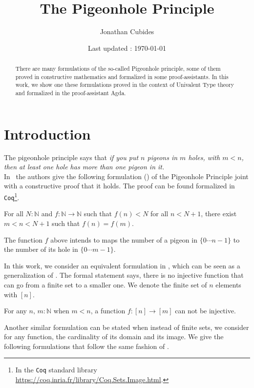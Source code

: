 \documentclass[11pt, a4paper, oneside]{amsart}
\title{The Pigeonhole Principle}
\date{Last updated : \today}
\author{Jonathan Cubides}
\begin{document}
\maketitle

\begin{abstract}
There are many formulations of the so-called Pigeonhole principle,
some of them proved in constructive mathematics and formalized
in some proof-assistants. In this work, we show one these formulations
proved in the context of Univalent Type theory and
formalized in the proof-assistant Agda.
\end{abstract}

\section{Introduction}

The pigeonhole principle says that \emph{if you put $n$ pigeons in
$m$ holes, with $m < n$, then at least one hole has more
than one pigeon in it.
}\\

In~\cite{symmetrybook} the authors give the following formulation
() of the Pigeonhole Principle joint with a constructive proof
that it holds. The proof can be found formalized in \texttt{Coq}\footnote{In
the \texttt{Coq} standard library
\url{https://coq.inria.fr/library/Coq.Sets.Image.html}.}.

\begin{theorem}\label{lem:PHP}
For all $N:ℕ$ and $f:ℕ\to ℕ$ such that $f(n)<N$
for all $n<N+1$, there exist $m < n < N+1$ such that $f(n)=f(m)$.
\end{theorem}
The function $f$ above intends to maps the number of a pigeon in $\{0\cdots n−1\}$ to
the number of its hole in $\{0\cdots m−1\}$.

In this work, we consider an equivalent formulation in ,
which can be seen as a generalization of . The formal statement
says, there is no injective function that can go from a finite set to a smaller
one. We denote the finite set of $n$ elements with $[n]$.

\begin{theorem}\label{pigeon-theorem}
For any $n,\, m : ℕ$ when $m < n$,  a function $f : [ n ] \to [ m ]$
can not be injective.
\end{theorem}

Another similar formulation can be stated when instead of finite sets, we
consider for any function, the cardinality of its domain and its image. We
give the following formulations that follow the same fashion of
.
\end{document}
